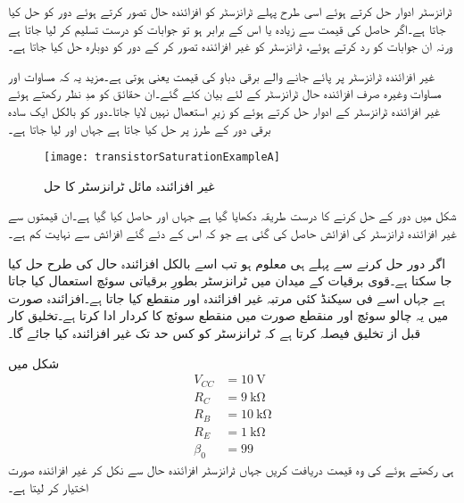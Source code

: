 ٹرانزسٹر ادوار حل کرتے ہوئے اسی طرح پہلے ٹرانزسٹر کو افزائندہ حال تصور کرتے ہوئے دور کو حل کیا جاتا ہے۔اگر حاصل  کی قیمت  سے زیادہ یا اس کے برابر ہو تو جوابات کو درست تسلیم کر لیا جاتا ہے ورنہ ان جوابات کو رد کرتے ہوئے، ٹرانزسٹر کو غیر افزائندہ تصور کر کے دور کو دوبارہ حل کیا جاتا ہے۔

غیر افزائندہ ٹرانزسٹر پر پائے جانے والے برقی دباو   کی قیمت  یعنی   ہوتی ہے۔مزید یہ کہ مساوات   اور مساوات   وغیرہ صرف افزائندہ حال ٹرانزسٹر کے لئے بیان کئے گئے۔ان حقائق کو مدِ نظر رکھتے ہوئے غیر افزائندہ ٹرانزسٹر کے ادوار حل کرتے ہوئے  کو زیرِ استعمال نہیں لایا جاتا۔دور کو بالکل ایک سادہ برقی دور کے طرز پر حل کیا جاتا ہے جہاں  اور لیا جاتا ہے۔
\begin{figure}
\centering
\texttt{[image: transistorSaturationExampleA]}
\caption{غیر افزائندہ مائل ٹرانزسٹر کا حل}
\label{شکل_غیر_افزائندہ_مثال}
\end{figure}
شکل   میں دور کے حل کرنے کا درست طریقہ دکھایا گیا ہے جہاں  اور  حاصل کیا گیا ہے۔ان قیمتوں سے غیر افزائندہ ٹرانزسٹر کی افزائش   حاصل کی گئی ہے جو کہ اس کے دئے گئے افزائش  سے نہایت کم ہے۔


اگر دور حل کرنے سے پہلے ہی   معلوم ہو تب اسے بالکل افزائندہ حال کی طرح حل کیا جا سکتا ہے۔قوی برقیات  کے میدان میں ٹرانزسٹر بطورِ برقیاتی سوئچ استعمال کیا جاتا ہے جہاں اسے  فی سیکنڈ کئی مرتبہ غیر افزائندہ اور منقطع کیا جاتا ہے۔افزائندہ صورت میں یہ چالو سوئچ اور منقطع صورت میں منقطع سوئچ کا کردار ادا کرتا ہے۔تخلیق کار قبل از تخلیق فیصلہ کرتا ہے کہ ٹرانزسٹر کو کس حد تک غیر افزائندہ کیا جائے گا۔

شکل   میں 
\begin{align*}
V_{CC}&=\SI{10}{\volt}\\
R_C &=\SI{9}{\kilo \ohm}\\
R_B&=\SI{10}{\kilo \ohm}\\
R_E&=\SI{1}{\kilo \ohm} \\
\beta_0&=99
\end{align*}
ہی رکھتے ہوئے  کی وہ قیمت دریافت کریں جہاں ٹرانزسٹر افزائندہ حال سے نکل کر غیر افزائندہ صورت اختیار کر لیتا ہے۔

